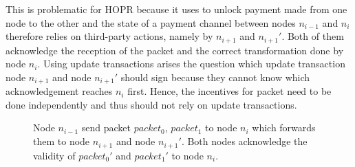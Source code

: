 This is problematic for HOPR because it uses  to unlock payment made from one node to the other and the state of a payment channel between nodes $n_{i-1}$ and $n_i$ therefore relies on third-party actions, namely by $n_{i+1}$ and $n_{i+1}'$. Both of them acknowledge the reception of the packet and the correct transformation done by node $n_i$. Using update transactions arises the question which update transaction node $n_{i+1}$ and node $n_{i+1}'$ should sign because they cannot know which acknowledgement reaches $n_i$ first. Hence, the incentives for packet need to be done independently and thus should not rely on update transactions.

\begin{figure}[H]
    \centering
    \caption{Node $n_{i-1}$ send packet $packet_0$, $packet_1$ to node $n_i$ which forwards them to node $n_{i+1}$ and node $n_{i+1}'$. Both nodes acknowledge the validity of $packet_0'$ and $packet_1'$ to node $n_i$.}
    \label{fig:sharedpaymentchannel}
\end{figure}

